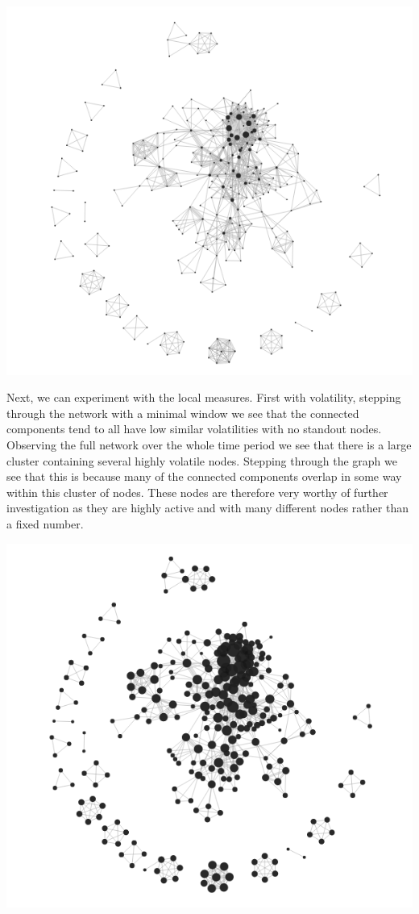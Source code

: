 \begin{center}
\includegraphics[trim={0 0 0 0}, width=140mm]{./Figures/TurinLocalVolatilityFull.png}
\end{center}
Next, we can experiment with the local measures. First with volatility, stepping through the network with a minimal window we see that the connected components tend to all have low similar volatilities with no standout nodes. Observing the full network over the whole time period we see that there is a large cluster containing several highly volatile nodes. Stepping through the graph we see that this is because many of the connected components overlap in some way within this cluster of nodes. These nodes are therefore very worthy of further investigation as they are highly active and with many different nodes rather than a fixed number.
\begin{center}
\includegraphics[trim={0 0 0 0}, width=140mm]{./Figures/TurinLocalCentralityFull.png}
\end{center}
